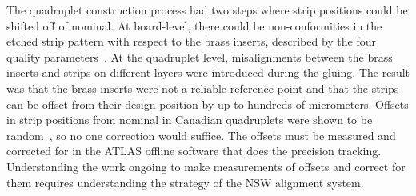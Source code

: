 
The quadruplet construction process had two steps where strip positions could be shifted off of nominal. At board-level, there could be non-conformities in the etched strip pattern with respect to the brass inserts, described by the four quality parameters~\cite{carlson_results_2019}. At the quadruplet level, misalignments between the brass inserts and strips on different layers were introduced during the gluing. The result was that the brass inserts were not a reliable reference point and that the strips can be offset from their design position by up to hundreds of micrometers. Offsets in strip positions from nominal in Canadian quadruplets were shown to be random~\cite{carlson_results_2019}, so no one correction would suffice. The offsets must be measured and corrected for in the ATLAS offline software that does the precision tracking. Understanding the work ongoing to make measurements of offsets and correct for them requires understanding the strategy of the NSW alignment system.



